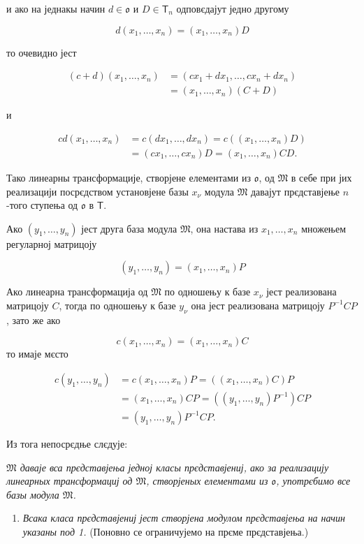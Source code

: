 \documentclass[11pt]{article}
\providecommand{\tightlist}{\setlength{\itemsep}{0pt}\setlength{\parskip}{0pt}}
\begin{document}
и ако на једнакы начин \(d\in\mathfrak{o}\) и \(D\in\mathsf T_n\) одповєдајут једно другому

\[
d(x_1,\ldots,x_n)=(x_1,\ldots,x_n)D
\]

то очевидно јест

\[
\begin{aligned}
(c+d)(x_1,\ldots,x_n)
&=(cx_1+dx_1,\ldots,cx_n+dx_n)\\
&=(x_1,\ldots,x_n)(C+D)
\end{aligned}
\]

и

\[
\begin{aligned}
cd(x_1,\ldots,x_n)
&=c(dx_1,\ldots,dx_n)=c((x_1,\ldots,x_n)D)\\
&=(cx_1,\ldots,cx_n)D=(x_1,\ldots,x_n)CD.
\end{aligned}
\]

Тако линеарны трансформације, створјене елементами из \(\mathfrak{o}\), од \(\mathfrak M\) в себе при јих реализацији посрєдством установјене базы \(x_\nu\) модула \(\mathfrak M\) давајут прєдставјење \(n\)-того ступења од \(\mathfrak{o}\) в \(\mathsf T\).

Ако \((y_1,\ldots,y_n)\) јест друга база модула \(\mathfrak M\), она настава из \(x_1,\ldots,x_n\) множењем регуларној матрицоју

\[(y_1,\ldots,y_n)=(x_1,\ldots,x_n)P\]

Ако линеарна трансформација од \(\mathfrak M\) по одношењу к базе \(x_\nu\) јест реализована матрицоју \(C\), тогда по одношењу к базе \(y_\nu\) она јест реализована матрицоју \(P^{-1}CP\), зато же ако

\[c(x_1,\ldots,x_n)=(x_1,\ldots,x_n)C\]
то имаје мєсто

\[
\begin{aligned}
c(y_1,\ldots,y_n)
&=c(x_1,\ldots,x_n)P=((x_1,\ldots,x_n)C)P\\
&=(x_1,\ldots,x_n)CP=((y_1,\ldots,y_n)P^{-1})CP\\
&=(y_1,\ldots,y_n)P^{-1}CP.
\end{aligned}
\]

Из тога непосрєдње слєдује:

\emph{\(\mathfrak M\) даваје вса прєдставјења једној класы прєдставјениј, ако за реализацију линеарных трансформациј од \(\mathfrak M\), створјеных елементами из \(\mathfrak{o}\), употрєбимо все базы модула \(\mathfrak M\).}

\begin{enumerate}
\def\labelenumi{\arabic{enumi}.}
\setcounter{enumi}{1}
\tightlist
\item
  \emph{Всака класа прєдставјениј јест створјена модулом прєдставјења на начин указаны под 1.} (Поновно се ограничујемо на прєме прєдставјења.)
\end{enumerate}
\end{document}
